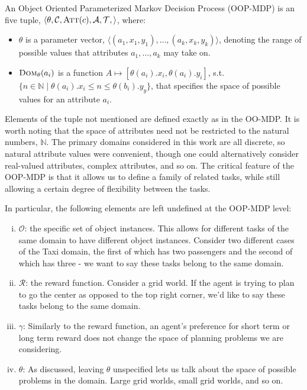 \documentclass[11pt]{article}
\begin{document}
{ An \textup{Object Oriented Parameterized Markov Decision Process (OOP-MDP)} is an five tuple, $\langle \theta, \mathcal{C}, \textsc{Att}(c),
\mathcal{A}, \mathcal{T}, \rangle$, where:

\begin{itemize}
\item $\theta$ is a parameter vector, $\langle (a_1, x_1, y_1), \ldots, (a_k, x_k, y_k) \rangle$, denoting the range of possible values that attributes $a_1, \ldots, a_k$ may take on.
\item $\textsc{Dom}_\theta(a_i)$ is a function $A \mapsto [\theta(a_i).x_i,\theta(a_i).y_i]$, s.t. $\{n \in \mathbb{N} \mid \theta(a_i).x_i \leq n \leq \theta(b_i).y_y \}$, that specifies the space of possible values for an attribute $a_i$.
\end{itemize}}

Elements of the tuple not mentioned are defined exactly as in the OO-MDP. It is worth noting that the space of attributes need not be restricted to the natural numbers, $\mathbb{N}$. The primary domains considered in this work are all discrete, so natural attribute values were convenient, though one could alternatively consider real-valued attributes, complex attributes, and so on. The critical feature of the OOP-MDP is that it allows us to define a family of related tasks, while still allowing a certain degree of flexibility between the tasks.

In particular, the following elements are left undefined at the OOP-MDP level:
\begin{enumerate}[(i)]
\item $\mathcal{O}$: the specific set of object instances. This allows for different tasks of the same domain to have different object instances. Consider two different cases of the Taxi domain, the first of which has two passengers and the second of which has three - we want to say these tasks belong to the same domain.
\item $\mathcal{R}$: the reward function. Consider a grid world. If the agent is trying to plan to go the center as opposed to the top right corner, we'd like to say these tasks belong to the same domain.
\item $\gamma$: Similarly to the reward function, an agent's preference for short term or long term reward does not change the space of planning problems we are considering.
\item $\theta $: As discussed, leaving $\theta$ unspecified lets us talk about the space of possible problems in the domain. Large grid worlds, small grid worlds, and so on.
\end{enumerate}
\end{document}
